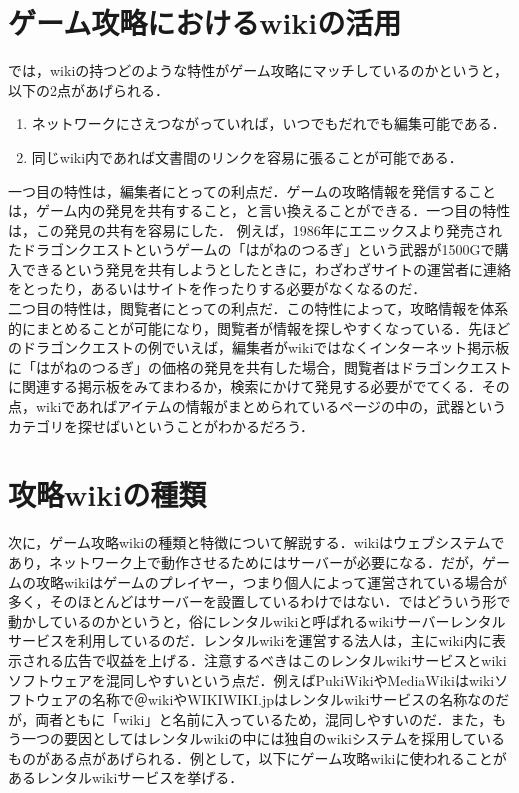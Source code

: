 \section{ゲーム攻略におけるwikiの活用}

では，wikiの持つどのような特性がゲーム攻略にマッチしているのかというと，以下の2点があげられる．

\begin{enumerate}
\item ネットワークにさえつながっていれば，いつでもだれでも編集可能である．
\item 同じwiki内であれば文書間のリンクを容易に張ることが可能である．
\end{enumerate}

一つ目の特性は，編集者にとっての利点だ．ゲームの攻略情報を発信することは，ゲーム内の発見を共有すること，と言い換えることができる．一つ目の特性は，この発見の共有を容易にした．
例えば，1986年にエニックスより発売されたドラゴンクエスト\cite{dorakue}というゲームの「はがねのつるぎ」という武器が1500Gで購入できるという発見を共有しようとしたときに，わざわざサイトの運営者に連絡をとったり，あるいはサイトを作ったりする必要がなくなるのだ．\\
二つ目の特性は，閲覧者にとっての利点だ．この特性によって，攻略情報を体系的にまとめることが可能になり，閲覧者が情報を探しやすくなっている．先ほどのドラゴンクエストの例でいえば，編集者がwikiではなくインターネット掲示板に「はがねのつるぎ」の価格の発見を共有した場合，閲覧者はドラゴンクエストに関連する掲示板をみてまわるか，検索にかけて発見する必要がでてくる．その点，wikiであればアイテムの情報がまとめられているページの中の，武器というカテゴリを探せばいということがわかるだろう．\\

\section{攻略wikiの種類}

次に，ゲーム攻略wikiの種類と特徴について解説する．wikiはウェブシステムであり，ネットワーク上で動作させるためにはサーバーが必要になる．だが，ゲームの攻略wikiはゲームのプレイヤー，つまり個人によって運営されている場合が多く，そのほとんどはサーバーを設置しているわけではない．ではどういう形で動かしているのかというと，俗にレンタルwikiと呼ばれるwikiサーバーレンタルサービスを利用しているのだ．レンタルwikiを運営する法人は，主にwiki内に表示される広告で収益を上げる．注意するべきはこのレンタルwikiサービスとwikiソフトウェアを混同しやすいという点だ．例えばPukiWikiやMediaWikiはwikiソフトウェアの名称で＠wikiやWIKIWIKI.jpはレンタルwikiサービスの名称なのだが，両者ともに「wiki」と名前に入っているため，混同しやすいのだ．また，もう一つの要因としてはレンタルwikiの中には独自のwikiシステムを採用しているものがある点があげられる．例として，以下にゲーム攻略wikiに使われることがあるレンタルwikiサービスを挙げる．\cite{wikimatome}

